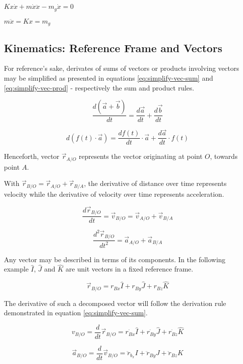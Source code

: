 $Kx\dot{x} + m\dot{x}\ddot{x} - m_g\dot{x} = 0$

$m\ddot{x} =  Kx = m_g$

\subsection{Kinematics: Reference Frame and Vectors}

For reference's sake, derivates of sums of vectors or products involving
vectors may be simplified as presented in equations
\ref{eq:simplify-vec-sum} and \ref{eq:simplify-vec-prod} - respectively the
sum and product rules.

\begin{equation}\label{eq:simplify-vec-sum}
  \frac{d(\vec{a} + \vec{b})}{dt} = \frac{d\vec{a}}{dt} + \frac{d \vec{b}}{dt}
\end{equation}

\begin{equation}\label{eq:simplify-vec-prod}
  d(f(t)\cdot\vec{a}) = \frac{d f(t)}{dt}\cdot\vec{a} + \frac{d\vec{a}}{dt}\cdot f(t)
\end{equation}

Henceforth, vector $\vec{r}_{A/O}$ represents the vector originating at point
$O$, towards point $A$.


With $\vec{r}_{B/O} = \vec{r}_{A/O} + \vec{r}_{B/A}$, the derivative of
distance over time represents velocity while the derivative of velocity over
time represents acceleration.

$$\frac{d\vec{r}_{B/O}}{dt} = \vec{v}_{B/O} = \vec{v}_{A/O} + \vec{v}_{B/A}$$

$$\frac{d^2 \vec{r}_{B/O}}{dt^2} = \vec{a}_{A/O} + \vec{a}_{B/A}$$


Any vector may be described in terms of its components. In the following
example $\hat I$, $\hat J$ and $\hat K$ are unit vectors in a fixed reference
frame.

$$\vec{r}_{B/O} = r_{Bx}\hat I + r_{By}\hat J + r_{Bz}\hat K$$

The derivative of such a decomposed vector will follow the derivation rule
demonstrated in equation \ref{eq:simplify-vec-sum}.

$$v_{B/O} = \frac{d}{dt}\vec{r}_{B/O} = \dot{r_{Bx}}\hat I +  \dot{r_{By}}\hat J +  \dot{r_{Bz}}\hat K$$


$$\vec{a}_{B/O} = \frac{d}{dt} \vec{v}_{B/O} = \ddot{r}_{b_x} I + \ddot{r}_{By} J + \ddot{r}_{Bz} K$$
